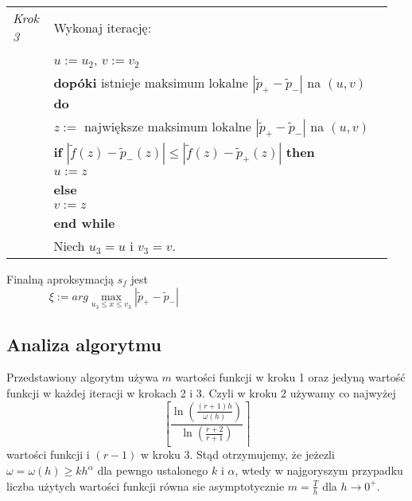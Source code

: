 \documentclass[oik, pdftex, robocza, man]{mgrwms}
\begin{document}
\begin{tabular}{p{0.10\linewidth} p{0.85\linewidth}}
    \textit{Krok 3} & Wykonaj iterację: \\
                    & $u := u_2$, $v := v_2$ \\
                    & \textbf{dopóki} istnieje maksimum lokalne $|\tilde{p}_{+} - \tilde{p}_{-}|$ na $(u,v)$ \textbf{do} \\
                    & \hspace{20pt}$z :=$ największe maksimum lokalne $|\tilde{p}_{+} - \tilde{p}_{-}|$ na $(u,v)$ \\
                    & \hspace{20pt}\textbf{if} $|\tilde{f}(z) - \tilde{p}_{-}(z)| \leq |\tilde{f}(z) - \tilde{p}_{+}(z)|$ \textbf{then} \\
                    & \hspace{40pt}$u:= z$ \\
                    & \hspace{20pt}\textbf{else} \\
                    & \hspace{40pt}$v:= z$ \\
                    & \textbf{end while} \\
                    & Niech $u_3 = u$ i $v_3 = v$.
\end{tabular} \vspace{10pt}

Finalną aproksymacją $s_f$ jest
\begin{equation*}
        \xi := arg \max_{u_3 \leq x \leq v_3}|\tilde{p}_{+} - \tilde{p}_{-}| \hspace{200pt}
\end{equation*}

\subsection{Analiza algorytmu}

Przedstawiony algorytm używa $m$ wartości funkcji w kroku 1 oraz jedyną wartość funkcji w każdej iteracji w krokach 2 i 3. Czyli w kroku 2 używamy co najwyżej
\begin{equation}
    \left[\frac{\ln \left(\frac{(r+1) h}{\omega(h)}\right)}{\ln \left(\frac{r+2}{r+1}\right)}\right\rceil
\end{equation}
wartości funkcji i $(r-1)$ w kroku 3.
Stąd otrzymujemy, że jeżezli $\omega = \omega(h) \geq kh^{\alpha}$ dla pewngo ustalonego $k$ i $\alpha$, wtedy w najgoryszym przypadku liczba użytych wartości funkcji równa sie asymptotycznie $m = \frac{T}{h}$ dla $h \rightarrow 0^{+}$.
\end{document}
